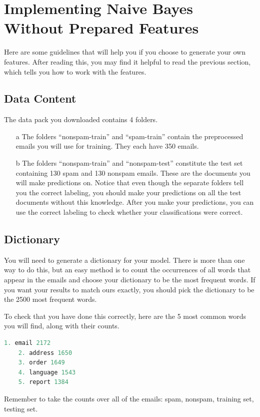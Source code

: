 \documentclass[10pt,a4paper]{article}
\begin{document}
\section{Implementing Naive Bayes Without Prepared Features}
%
  Here are some guidelines that will help you if you choose to generate your own features. After reading this, you may find it helpful to read the previous section, which tells you how to work with the features.


  \subsection{Data Content}
  The data pack you downloaded contains 4 folders.
  \begin{itemize}
    \item[a] The folders ``nonspam-train'' and ``spam-train'' contain the preprocessed emails you will use for training. They each have 350 emails.
    \item[b] The folders ``nonspam-train'' and ``nonspam-test'' constitute the test set containing 130 spam and 130 nonspam emails. These are the documents you will make predictions on. Notice that even though the separate folders tell you the correct labeling, you should make your predictions on all the test documents without this knowledge. After you make your predictions, you can use the correct labeling to check whether your classifications were correct.
  \end{itemize}



  \subsection{Dictionary}
  You will need to generate a dictionary for your model. There is more than one way to do this, but an easy method is to count the occurrences of all words that appear in the emails and choose your dictionary to be the most frequent words. If you want your results to match ours exactly, you should pick the dictionary to be the 2500 most frequent words.

  To check that you have done this correctly, here are the 5 most common words you will find, along with their counts.
  \begin{lstlisting}[language=C, basicstyle=\footnotesize, showspaces=false]
    1. email 2172
    2. address 1650
    3. order 1649
    4. language 1543
    5. report 1384
  \end{lstlisting}
  Remember to take the counts over all of the emails: spam, nonspam, training set, testing set.
\end{document}
